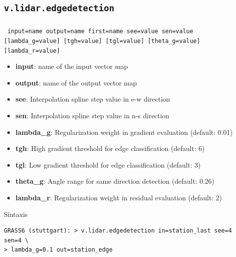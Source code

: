 \subsection{\texttt{v.lidar.edgedetection}}
\begin{frame}[fragile,shrink=10]
  \frametitle{}
  \begin{beamerboxesrounded}[shadow=true]{\textbf{}
    \texttt{ input=name output=name first=name see=value sen=value 
    [lambda\_g=value] [tgh=value] [tgl=value] [theta\_g=value] [lambda\_r=value]}}
   \begin{itemize}
    \item \textbf{input}: name of the input vector map
    \item \textbf{output}: name of the output vector map
    \item \textbf{see}: Interpolation spline step value in e-w direction
    \item \textbf{sen}: Interpolation spline step value in n-s direction
    \item \textbf{lambda\_g}: Regularization weight in gradient evaluation (default: 0.01)
    \item \textbf{tgh}: High gradient threshold for edge classification (default: 6)
    \item \textbf{tgl}: Low gradient threshold for edge classification (default: 3)
    \item \textbf{theta\_g}: Angle range for same direction detection (default: 0.26)
    \item \textbf{lambda\_r}: Regularization weight in residual evaluation (default: 2)
   \end{itemize}
  \end{beamerboxesrounded}
 \begin{beamerboxesrounded}[shadow=true]{Sintaxis}
\scriptsize
\begin{verbatim}
GRASS6 (stuttgart): > v.lidar.edgedetection in=station_last see=4 sen=4 \
> lambda_g=0.1 out=station_edge
\end{verbatim}
\end{beamerboxesrounded}
\end{frame}
